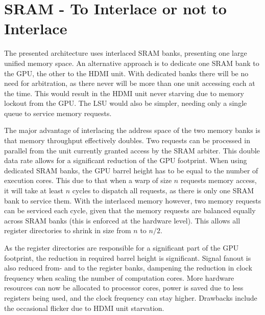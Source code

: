 \section{SRAM - To Interlace or not to Interlace}

The presented architecture uses interlaced SRAM banks, presenting one large unified memory space.
An alternative approach is to dedicate one SRAM bank to the GPU, the other to the HDMI unit.
With dedicated banks there will be no need for arbitration, as there never will be more than one unit accessing each at the time.
This would result in the HDMI unit never starving due to memory lockout from the GPU.
The LSU would also be simpler, needing only a single queue to service memory requests.

The major advantage of interlacing the address space of the two memory banks is that memory throughput effectively doubles.
Two requests can be processed in parallel from the unit currently granted access by the SRAM arbiter.
This double data rate allows for a significant reduction of the GPU footprint.
When using dedicated SRAM banks, the GPU barrel height has to be equal to the number of execution cores.
This due to that when a warp of size $n$ requests memory access, it will take at least $n$ cycles to dispatch all requests, as there is only one SRAM bank to service them.
With the interlaced memory however, two memory requests can be serviced each cycle, given that the memory requests are balanced equally across SRAM banks (this is enforced at the hardware level).
This allows all register directories to shrink in size from $n$ to $n/2$.

As the register directories are responsible for a significant part of the GPU footprint, the reduction in required barrel height is significant.
Signal fanout is also reduced from- and to the register banks, dampening the reduction in clock frequency when scaling the number of computation cores.
More hardware resources can now be allocated to processor cores, power is saved due to less registers being used, and the clock frequency can stay higher.
Drawbacks include the occasional flicker due to HDMI unit starvation.
